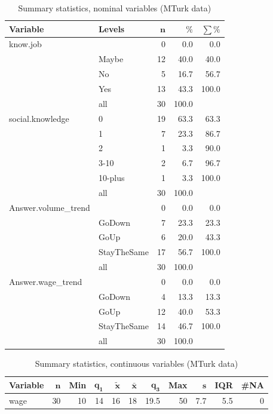 \documentclass[a4paper,10pt]{article}\usepackage[]{graphicx}\usepackage[]{color}
\begin{document}
\begin{table}[ht]
\centering
{\footnotesize
\begin{tabular}{ll|rrr}
 \textbf{Variable} & \textbf{Levels} & $\mathbf{n}$ & $\mathbf{\%}$ & $\mathbf{\sum \%}$ \\ 
  \hline
know.job &  & 0 & 0.0 & 0.0 \\ 
   & Maybe & 12 & 40.0 & 40.0 \\ 
   & No & 5 & 16.7 & 56.7 \\ 
   & Yes & 13 & 43.3 & 100.0 \\ 
   \hline
 & all & 30 & 100.0 &  \\ 
   \hline
\hline
social.knowledge & 0 & 19 & 63.3 & 63.3 \\ 
   & 1 & 7 & 23.3 & 86.7 \\ 
   & 2 & 1 & 3.3 & 90.0 \\ 
   & 3-10 & 2 & 6.7 & 96.7 \\ 
   & 10-plus & 1 & 3.3 & 100.0 \\ 
   \hline
 & all & 30 & 100.0 &  \\ 
   \hline
\hline
Answer.volume\_trend &  & 0 & 0.0 & 0.0 \\ 
   & GoDown & 7 & 23.3 & 23.3 \\ 
   & GoUp & 6 & 20.0 & 43.3 \\ 
   & StayTheSame & 17 & 56.7 & 100.0 \\ 
   \hline
 & all & 30 & 100.0 &  \\ 
   \hline
\hline
Answer.wage\_trend &  & 0 & 0.0 & 0.0 \\ 
   & GoDown & 4 & 13.3 & 13.3 \\ 
   & GoUp & 12 & 40.0 & 53.3 \\ 
   & StayTheSame & 14 & 46.7 & 100.0 \\ 
   \hline
 & all & 30 & 100.0 &  \\ 
   \hline
\hline
\end{tabular}
}
\caption{Summary statistics, nominal variables (MTurk data)} 
\label{tab1:51-1010}
\end{table}
\begin{table}[ht]
\centering
{\footnotesize
\begin{tabular}{lrrrrrrrrrr}
 \textbf{Variable} & $\mathbf{n}$ & \textbf{Min} & $\mathbf{q_1}$ & $\mathbf{\widetilde{x}}$ & $\mathbf{\bar{x}}$ & $\mathbf{q_3}$ & \textbf{Max} & $\mathbf{s}$ & \textbf{IQR} & \textbf{\#NA} \\ 
  \hline
wage & 30 & 10 & 14 & 16 & 18 & 19.5 & 50 & 7.7 & 5.5 & 0 \\ 
  \end{tabular}
}
\caption{Summary statistics, continuous variables (MTurk data)} 
\label{tab2:51-1010}
\end{table}
\end{document}

